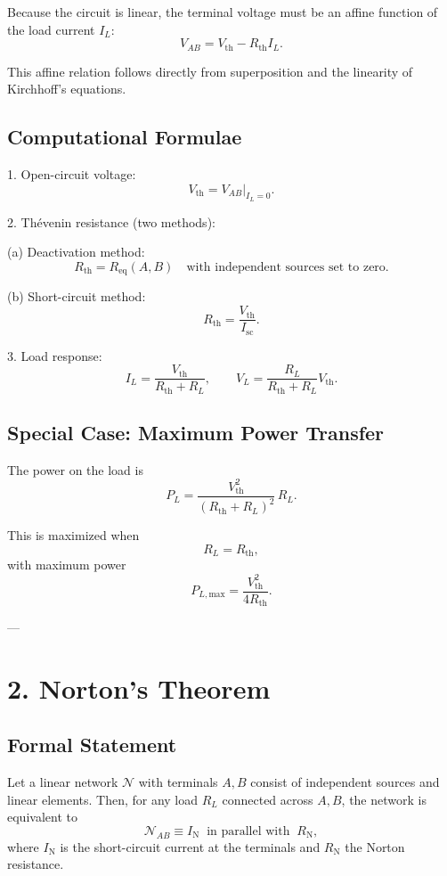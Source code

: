 \documentclass[12pt]{article}
\begin{document}
	Because the circuit is linear, the terminal voltage must be an affine function of the load current $I_L$:
	$$
	V_{AB} = V_{\text{th}} - R_{\text{th}} I_L.
	$$
	
	This affine relation follows directly from superposition and the linearity of Kirchhoff's equations.
	
	\subsection*{Computational Formulae}
	
	1. Open-circuit voltage:
	$$
	V_{\text{th}} = V_{AB}\Big|_{I_L = 0}.
	$$
	
	2. Thévenin resistance (two methods):
	
	(a) Deactivation method:
	$$
	R_{\text{th}} = R_{\text{eq}}(A,B) \quad \text{with independent sources set to zero}.
	$$
	
	(b) Short-circuit method:
	$$
	R_{\text{th}} = \frac{V_{\text{th}}}{I_{\text{sc}}}.
	$$
	
	3. Load response:
	$$
	I_L = \frac{V_{\text{th}}}{R_{\text{th}} + R_L}, 
	\qquad
	V_L = \frac{R_L}{R_{\text{th}} + R_L} V_{\text{th}}.
	$$
	
	\subsection*{Special Case: Maximum Power Transfer}
	
	The power on the load is
	$$
	P_L = \frac{V_{\text{th}}^2}{(R_{\text{th}} + R_L)^2} \, R_L.
	$$
	
	This is maximized when
	$$
	R_L = R_{\text{th}},
	$$
	with maximum power
	$$
	P_{L,\text{max}} = \frac{V_{\text{th}}^2}{4R_{\text{th}}}.
	$$
	
	---
	
	\section*{2. Norton's Theorem}
	
	\subsection*{Formal Statement}
	
	Let a linear network $\mathcal{N}$ with terminals $A,B$ consist of independent sources and linear elements.  
	Then, for any load $R_L$ connected across $A,B$, the network is equivalent to
	$$
	\mathcal{N}_{AB} \equiv I_{\text{N}} \;\; \text{in parallel with} \;\; R_{\text{N}},
	$$
	where $I_{\text{N}}$ is the short-circuit current at the terminals and $R_{\text{N}}$ the Norton resistance.
	
\end{document}
